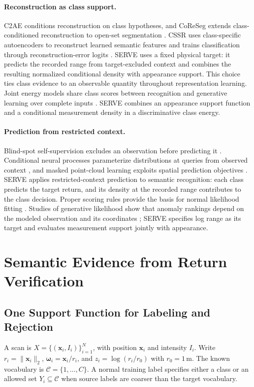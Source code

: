 \documentclass{article}
\begin{document}
\paragraph{Reconstruction as class support.}
C2AE conditions reconstruction on class hypotheses, and CoReSeg extends class-conditioned reconstruction to open-set segmentation \citep{c2ae,coreseg}. CSSR uses class-specific autoencoders to reconstruct learned semantic features and trains classification through reconstruction-error logits \citep{cssr}. SERVE uses a fixed physical target: it predicts the recorded range from target-excluded context and combines the resulting normalized conditional density with appearance support. This choice ties class evidence to an observable quantity throughout representation learning. Joint energy models share class scores between recognition and generative learning over complete inputs \citep{jem}. SERVE combines an appearance support function and a conditional measurement density in a discriminative class energy.

\paragraph{Prediction from restricted context.}
Blind-spot self-supervision excludes an observation before predicting it \citep{noise2self,blindspot,pn2v}. Conditional neural processes parameterize distributions at queries from observed context \citep{cnp,anp}, and masked point-cloud learning exploits spatial prediction objectives \citep{pointmae}. SERVE applies restricted-context prediction to semantic recognition: each class predicts the target return, and its density at the recorded range contributes to the class decision. Proper scoring rules provide the basis for normal likelihood fitting \citep{proper}. Studies of generative likelihood show that anomaly rankings depend on the modeled observation and its coordinates \citep{likelihood,perfectdensity}; SERVE specifies log range as its target and evaluates measurement support jointly with appearance.

\section{Semantic Evidence from Return Verification}
\label{sec:method}
\subsection{One Support Function for Labeling and Rejection}
A scan is $X=\{(\mathbf x_i,I_i)\}_{i=1}^{N}$, with position $\mathbf x_i$ and intensity $I_i$. Write $r_i=\|\mathbf x_i\|_2$, $\boldsymbol\omega_i=\mathbf x_i/r_i$, and $z_i=\log(r_i/r_0)$ with $r_0=1$\,m. The known vocabulary is $\mathcal C=\{1,\ldots,C\}$. A normal training label specifies either a class or an allowed set $Y_i\subseteq\mathcal C$ when source labels are coarser than the target vocabulary.
\end{document}
